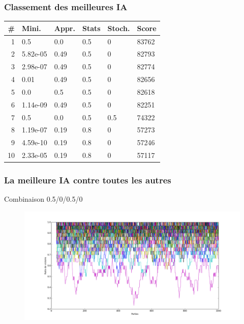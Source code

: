 \documentclass{beamer}
\begin{document}
\begin{frame}
  \frametitle{Classement des meilleures IA}
  \begin{center}
    \begin{tabular}{|r|l|l|l|l|l|}
      \hline
      \#  &  Mini.     &  Appr.  &  Stats  &  Stoch.  &  Score  \\
      \hline
      1   &  0.5       &  0.0    &  0.5    &  0       &  83762  \\
      2   &  5.82e-05  &  0.49   &  0.5    &  0       &  82793  \\
      3   &  2.98e-07  &  0.49   &  0.5    &  0       &  82774  \\
      4   &  0.01      &  0.49   &  0.5    &  0       &  82656  \\
      5   &  0.0       &  0.5    &  0.5    &  0       &  82618  \\
      6   &  1.14e-09  &  0.49   &  0.5    &  0       &  82251  \\
      7   &  0.5       &  0.0    &  0.5    &  0.5     &  74322  \\
      8   &  1.19e-07  &  0.19   &  0.8    &  0       &  57273  \\
      9   &  4.59e-10  &  0.19   &  0.8    &  0       &  57246  \\
      10  &  2.33e-05  &  0.19   &  0.8    &  0       &  57117  \\
      \hline
    \end{tabular}
  \end{center}
\end{frame}

\begin{frame}
  \frametitle{La meilleure IA contre toutes les autres}

  \center Combinaison 0.5/0/0.5/0

  \begin{figure}
    \includegraphics[scale=0.265, trim=0 2cm 0 0]{plot/best}
  \end{figure}
\end{frame}
\end{document}
